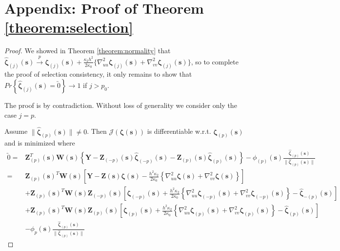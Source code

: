 \documentclass[12pt,english,authoryear, review]{article}\usepackage[]{graphicx}\usepackage[]{color}
\theoremstyle{plain}
\theoremstyle{plain}
\begin{document}
\section*{Appendix: Proof of Theorem \ref{theorem:selection}\label{sec:gaussian-selection-proof}}
\begin{proof}
We showed in Theorem \ref{theorem:normality} that $\hat{\bm{\zeta}}_{\left(j\right)}\left(\bm{s}\right)\xrightarrow{p}\bm{\zeta}_{\left(j\right)}\left(\bm{s}\right)+\frac{\kappa_{2}h^{2}}{2\kappa_{0}}\{\nabla_{uu}^{2}\bm{\zeta}_{\left(j\right)}\left(\bm{s}\right)+\nabla_{vv}^{2}\bm{\zeta}_{\left(j\right)}\left(\bm{s}\right)\}$,
so to complete the proof of selection consistency, it only remains
to show that $Pr\left\{ \hat{\bm{\zeta}}_{\left(j\right)}\left(\bm{s}\right)=\utilde{0}\right\} \to1$
if $j>p_{0}$.

The proof is by contradiction. Without loss of generality we consider
only the case $j=p$.

Assume $\|\hat{\bm{\zeta}}_{\left(p\right)}(\bm{s})\|\ne0$. Then
$\mathcal{J}\left(\bm{\zeta}\left(\bm{s}\right)\right)$ is differentiable
w.r.t. $\bm{\zeta}_{\left(p\right)}\left(\bm{s}\right)$ and is minimized
where 
\begin{align*}
\utilde{0}= & \bm{Z}_{\left(p\right)}^{T}\left(\bm{s}\right)\bm{W}\left(\bm{s}\right)\left\{ \bm{Y}-\bm{Z}_{\left(-p\right)}\left(\bm{s}\right)\hat{\bm{\zeta}}_{\left(-p\right)}\left(\bm{s}\right)-\bm{Z}_{\left(p\right)}\left(\bm{s}\right)\hat{\bm{\zeta}}_{\left(p\right)}\left(\bm{s}\right)\right\} -\phi_{\left(p\right)}(\bm{s})\frac{\hat{\bm{\zeta}}_{\left(p\right)}\left(\bm{s}\right)}{\|\hat{\bm{\zeta}}_{\left(p\right)}\left(\bm{s}\right)\|}\\
= & \bm{Z}_{\left(p\right)}\left(\bm{s}\right)^{T}\bm{W}\left(\bm{s}\right)\left[\bm{Y}-\bm{Z}\left(\bm{s}\right)\bm{\zeta}\left(\bm{s}\right)-\frac{h^{2}\kappa_{2}}{2\kappa_{0}}\left\{ \nabla_{uu}^{2}\bm{\zeta}\left(\bm{s}\right)+\nabla_{vv}^{2}\bm{\zeta}\left(\bm{s}\right)\right\} \right]\\
 & +\bm{Z}_{\left(p\right)}\left(\bm{s}\right)^{T}\bm{W}\left(\bm{s}\right)\bm{Z}_{\left(-p\right)}\left(\bm{s}\right)\left[\bm{\zeta}_{\left(-p\right)}\left(\bm{s}\right)+\frac{h^{2}\kappa_{2}}{2\kappa_{0}}\left\{ \nabla_{uu}^{2}\bm{\zeta}_{\left(-p\right)}\left(\bm{s}\right)+\nabla_{vv}^{2}\bm{\zeta}_{\left(-p\right)}\left(\bm{s}\right)\right\} -\hat{\bm{\zeta}}_{-\left(p\right)}\left(\bm{s}\right)\right]\\
 & +\bm{Z}_{\left(p\right)}\left(\bm{s}\right)^{T}\bm{W}\left(\bm{s}\right)\bm{Z}_{\left(p\right)}\left(\bm{s}\right)\left[\bm{\zeta}_{\left(p\right)}\left(\bm{s}\right)+\frac{h^{2}\kappa_{2}}{2\kappa_{0}}\left\{ \nabla_{uu}^{2}\bm{\zeta}_{\left(p\right)}\left(\bm{s}\right)+\nabla_{vv}^{2}\bm{\zeta}_{\left(p\right)}\left(\bm{s}\right)\right\} -\hat{\bm{\zeta}}_{\left(p\right)}\left(\bm{s}\right)\right]\\
 & -\phi_{p}\left(\bm{s}\right)\frac{\hat{\bm{\zeta}}_{\left(p\right)}\left(\bm{s}\right)}{\|\hat{\bm{\zeta}}_{\left(p\right)}\left(\bm{s}\right)\|}
\end{align*}



\end{proof}
\end{document}
